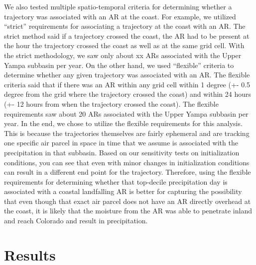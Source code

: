 \documentclass[draft]{agujournal2019}
\begin{document}
We also tested multiple spatio-temporal criteria for determining whether a trajectory was associated with an AR at the coast. For example, we utilized “strict” requirements for associating a trajectory at the coast with an AR. The strict method said if a trajectory crossed the coast, the AR had to be present at the hour the trajectory crossed the coast as well as at the same grid cell. With the strict methodology, we saw only about xx ARs associated with the Upper Yampa subbasin per year. On the other hand, we used “flexible” criteria to determine whether any given trajectory was associated with an AR. The flexible criteria said that if there was an AR within any grid cell within 1 degree (+- 0.5 degree from the grid where the trajectory crossed the coast) and within 24 hours (+- 12 hours from when the trajectory crossed the coast). The flexible requirements saw about 20 ARs associated with the Upper Yampa subbasin per year. In the end, we chose to utilize the flexible requirements for this analysis. This is because the trajectories themselves are fairly ephemeral and are tracking one specific air parcel in space in time that we assume is associated with the precipitation in that subbasin. Based on our sensitivity tests on initialization conditions, you can see that even with minor changes in initialization conditions can result in a different end point for the trajectory. Therefore, using the flexible requirements for determining whether that top-decile precipitation day is associated with a coastal landfalling AR is better for capturing the possibility that even though that exact air parcel does not have an AR directly overhead at the coast, it is likely that the moisture from the AR was able to penetrate inland and reach Colorado and result in precipitation.

%
%
%
\section{Results}
\end{document}

